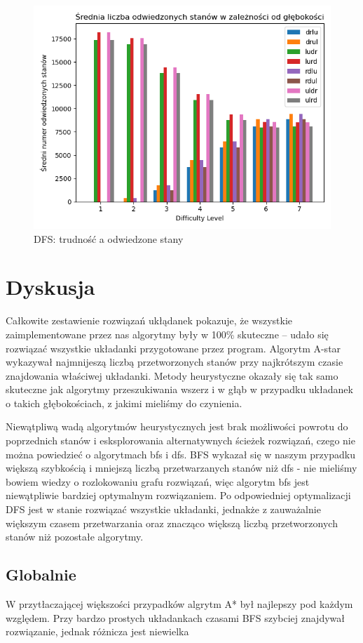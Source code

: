 \documentclass{classrep}
\begin{document}
\begin{figure}[p] \centering
  \label{ostatni}
 \includegraphics[width=0.9\linewidth]{./pic/dfs_vstd_c_vs_diff.png}
 \caption{DFS: trudność a odwiedzone stany}
\end{figure}

\section{Dyskusja}
Całkowite zestawienie rozwiązań ukłądanek pokazuje, że wszystkie zaimplementowane przez nas algorytmy były w 100\% skuteczne -- udało się rozwiązać wszystkie układanki przygotowane 
przez program. Algorytm A-star wykazywał najmnijeszą liczbą przetworzonych stanów przy najkrótszym czasie znajdowania właściwej układanki. Metody heurystyczne okazały się tak samo
skuteczne jak algorytmy przeszukiwania wszerz i w głąb w przypadku układanek o takich głębokościach, z jakimi mieliśmy do czynienia. 

Niewątpliwą wadą algorytmów heurystycznych jest brak możliwości powrotu do poprzednich stanów i esksplorowania alternatywnych ścieżek rozwiązań, czego nie można powiedzieć o algorytmach bfs i dfs. BFS wykazał się w naszym przypadku większą szybkością i mniejszą liczbą przetwarzanych stanów niż dfs - nie mieliśmy bowiem wiedzy o rozlokowaniu grafu rozwiązań, więc algorytm bfs jest niewątpliwie bardziej optymalnym rozwiązaniem. Po odpowiedniej optymalizacji DFS jest w stanie rozwiązać wszystkie układanki, jednakże z zauważalnie większym czasem przetwarzania oraz znacząco większą liczbą przetworzonych stanów niż pozostałe algorytmy.

\subsection{Globalnie}
W przytłaczającej większości przypadków algrytm A* był najlepszy pod każdym względem.
Przy bardzo prostych układankach czasami BFS szybciej znajdywał rozwiązanie, jednak różnicza jest niewielka
\end{document}
